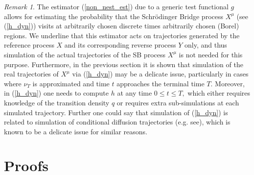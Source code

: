 \documentclass[a4paper,11pt]{amsart}
\theoremstyle{plain}
\theoremstyle{remark}
\newtheorem{remark}[theorem]{Remark}
\begin{document}
\begin{remark}
The estimator  (\ref{non_nest_est}) due to a generic 
test functional $g$ allows for estimating the probability that  the Schr\"odinger Bridge process $X^\mu$ (see (\ref{h_dyn})) visits at arbitrarily chosen discrete times  arbitrarily chosen (Borel) regions. We underline that 
this estimator acts on trajectories generated by the reference process $X$ and its corresponding reverse process $Y$ only,
and thus simulation of the actual trajectories of the SB process $X^\mu$ is not needed for this purpose. 
Furthermore, in the previous section it is shown that
simulation of the real trajectories 
of $X^\mu$ via (\ref{h_dyn}) may be a delicate issue, particularly in cases where 
$\nu_T$ is approximated and time $t$ approaches the terminal time $T$. Moreover,
in (\ref{h_dyn})  one needs to compute $h$ at any time $0\leq t\leq T,$ 
which either requires knowledge of the transition density $q$ or 
requires extra sub-simulations at each simulated trajectory.
Further one could say that simulation of (\ref{h_dyn}) is related to simulation of conditional diffusion trajectories (e.g. see\cite{Schauer17}), which is known to be a delicate issue 
for similar reasons. 
\end{remark}


\section{Proofs}\label{proofs}
\end{document}

